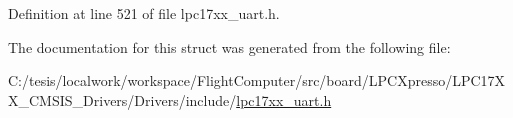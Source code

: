 \-Definition at line 521 of file lpc17xx\-\_\-uart.\-h.



\-The documentation for this struct was generated from the following file\-:\begin{DoxyCompactItemize}
\item 
\-C\-:/tesis/localwork/workspace/\-Flight\-Computer/src/board/\-L\-P\-C\-Xpresso/\-L\-P\-C17\-X\-X\-\_\-\-C\-M\-S\-I\-S\-\_\-\-Drivers/\-Drivers/include/\hyperlink{lpc17xx__uart_8h}{lpc17xx\-\_\-uart.\-h}\end{DoxyCompactItemize}
